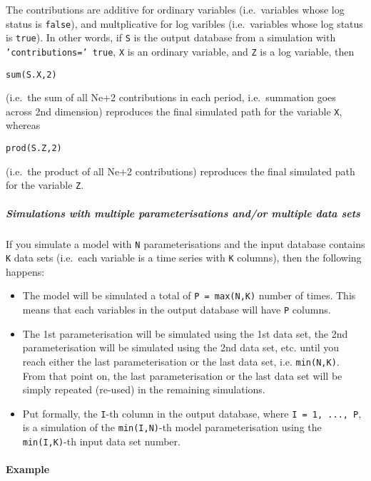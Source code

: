 The contributions are additive for ordinary variables (i.e.~variables
whose log status is \texttt{false}), and multplicative for log varibles
(i.e.~variables whose log status is \texttt{true}). In other words, if
\texttt{S} is the output database from a simulation with
\texttt{'contributions=' true}, \texttt{X} is an ordinary variable, and
\texttt{Z} is a log variable, then

\begin{verbatim}
sum(S.X,2)
\end{verbatim}

(i.e.~the sum of all Ne+2 contributions in each period, i.e.~summation
goes across 2nd dimension) reproduces the final simulated path for the
variable \texttt{X}, whereas

\begin{verbatim}
prod(S.Z,2)
\end{verbatim}

(i.e.~the product of all Ne+2 contributions) reproduces the final
simulated path for the variable \texttt{Z}.

\subparagraph{Simulations with multiple parameterisations and/or
multiple data
sets}\label{simulations-with-multiple-parameterisations-andor-multiple-data-sets}

If you simulate a model with \texttt{N} parameterisations and the input
database contains \texttt{K} data sets (i.e.~each variable is a time
series with \texttt{K} columns), then the following happens:

\begin{itemize}
\item
  The model will be simulated a total of \texttt{P = max(N,K)} number of
  times. This means that each variables in the output database will have
  \texttt{P} columns.
\item
  The 1st parameterisation will be simulated using the 1st data set, the
  2nd parameterisation will be simulated using the 2nd data set, etc.
  until you reach either the last parameterisation or the last data set,
  i.e. \texttt{min(N,K)}. From that point on, the last parameterisation
  or the last data set will be simply repeated (re-used) in the
  remaining simulations.
\item
  Put formally, the \texttt{I}-th column in the output database, where
  \texttt{I = 1, ..., P}, is a simulation of the \texttt{min(I,N)}-th
  model parameterisation using the \texttt{min(I,K)}-th input data set
  number.
\end{itemize}

\paragraph{Example}\label{example}


